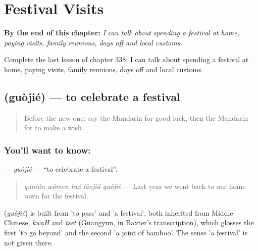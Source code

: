 
\chapter{Festival Visits}
\label{ch:zh-festival-visits}

\begin{chapteropening}
\textbf{By the end of this chapter:} \emph{I can talk about spending a festival at home, paying visits, family reunions, days off and local customs.}

Complete the last lesson of chapter 338: I can talk about spending a festival at home, paying visits, family reunions, days off and local customs.
\end{chapteropening}

\section[\texorpdfstring{\zh{过节} (guòjié)}{过节 (guòjié)}]{ (guòjié) — to celebrate a festival}

\label{lesson:ZH-C338-guojie}



\begin{quote}
Before the new one: say the Mandarin for good luck, then the Mandarin for to make a wish.
\end{quote}

\subsection*{You'll want to know: }
\textbf{} — \emph{guòjié} — \textquotedblleft{}to celebrate a festival\textquotedblright{}.

\begin{quote}
\textbf{} \emph{qùnián wǒmen huí lǎojiā guòjié} — Last year we went back to our home town for the festival.
\end{quote}

\begin{cousinweb}
\textbf{} (\emph{guòjié}) is built from  'to pass' and  'a festival', both inherited from Middle Chinese, \emph{kwaH} and \emph{tset} (Guangyun, in Baxter's transcription), which glosses the first 'to go beyond' and the second 'a joint of bamboo'. The sense 'a festival' is not given there.
\end{cousinweb}

